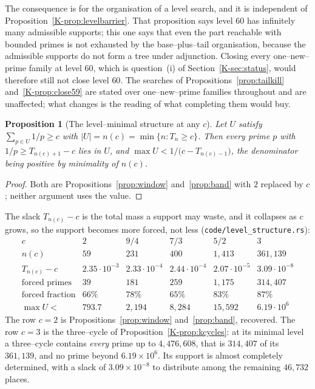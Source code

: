 \documentclass[11pt]{article}
\newtheorem{proposition}[theorem]{Proposition}
\theoremstyle{definition}
\begin{document}
The consequence is for the organisation of a level search, and it is independent of
Proposition~\ref{K-prop:levelbarrier}. That proposition says level $60$ has infinitely many admissible
supports; this one says that even the part reachable with bounded primes is not exhausted by the
base--plus--tail organisation, because the admissible supports do not form a tree under adjunction.
Closing every one--new--prime family at level $60$, which is question~(i) of
Section~\ref{K-sec:status}, would therefore still not close level $60$. The searches of
Propositions~\ref{prop:tailkill} and~\ref{K-prop:close59} are stated over one--new--prime families
throughout and are unaffected; what changes is the reading of what completing them would buy.

\begin{proposition}[The level--minimal structure at any $c$]\label{prop:levelstructure}
Let $U$ satisfy $\sum_{p\in U}1/p\ge c$ with $|U|=n(c)=\min\{n:T_n\ge c\}$. Then every prime $p$ with
$1/p\ge T_{n(c)+1}-c$ lies in $U$, and $\max U<1/\bigl(c-T_{n(c)-1}\bigr)$, the denominator being
positive by minimality of $n(c)$.
\end{proposition}
\begin{proof}
Both are Propositions~\ref{prop:window} and~\ref{prop:band} with $2$ replaced by $c$; neither
argument uses the value.
\end{proof}

The slack $T_{n(c)}-c$ is the total mass a support may waste, and it collapses as $c$ grows, so the
support becomes more forced, not less \textup{(\texttt{code/level\_structure.rs})}:
\[
\begin{array}{l|ccccc}
c & 2 & 9/4 & 7/3 & 5/2 & 3\\\hline
n(c) & 59 & 231 & 400 & 1{,}413 & 361{,}139\\
T_{n(c)}-c & 2.35\!\cdot\!10^{-3} & 2.33\!\cdot\!10^{-4} & 2.44\!\cdot\!10^{-4} &
  2.07\!\cdot\!10^{-5} & 3.09\!\cdot\!10^{-8}\\
\text{forced primes} & 39 & 181 & 259 & 1{,}175 & 314{,}407\\
\text{forced fraction} & 66\% & 78\% & 65\% & 83\% & 87\%\\
\max U< & 793.7 & 2{,}194 & 8{,}284 & 15{,}592 & 6.19\!\cdot\!10^{6}
\end{array}
\]
The row $c=2$ is Propositions~\ref{prop:window} and~\ref{prop:band}, recovered. The row $c=3$ is the
three--cycle of Proposition~\ref{K-prop:kcycles}: at its minimal level a three--cycle contains
\emph{every} prime up to $4{,}476{,}608$, that is $314{,}407$ of its $361{,}139$, and no prime beyond
$6.19\times10^{6}$. Its support is almost completely determined, with a slack of $3.09\times10^{-8}$
to distribute among the remaining $46{,}732$ places.
\end{document}
